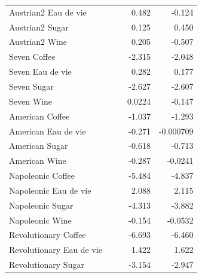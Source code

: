 \documentclass[12pt,a4paper,titlepage]{article}
\begin{document}
\begin{table}[htbp]
\begin{tabular}{l*{4}{D{.}{.}{-1}}}
Austrian2 Eau de vie&                     &                     &       0.482         &      -0.124         \\
Austrian2 Sugar     &                     &                     &       0.125         &       0.450         \\
Austrian2 Wine      &                     &                     &       0.205         &      -0.507\sym{*}  \\
Seven Coffee        &                     &                     &      -2.315\sym{***}&      -2.048\sym{***}\\
Seven Eau de vie    &                     &                     &       0.282         &       0.177         \\
Seven Sugar         &                     &                     &      -2.627\sym{***}&      -2.607\sym{***}\\
Seven Wine          &                     &                     &      0.0224         &      -0.147         \\
American Coffee     &                     &                     &      -1.037\sym{***}&      -1.293\sym{***}\\
American Eau de vie &                     &                     &      -0.271         &   -0.000709         \\
American Sugar      &                     &                     &      -0.618\sym{*}  &      -0.713\sym{*}  \\
American Wine       &                     &                     &      -0.287\sym{*}  &     -0.0241         \\
Napoleonic Coffee   &                     &                     &      -5.484\sym{***}&      -4.837\sym{***}\\
Napoleonic Eau de vie&                     &                     &       2.088\sym{***}&       2.115\sym{***}\\
Napoleonic Sugar    &                     &                     &      -4.313\sym{***}&      -3.882\sym{***}\\
Napoleonic Wine     &                     &                     &      -0.154         &     -0.0532         \\
Revolutionary Coffee&                     &                     &      -6.693\sym{***}&      -6.460\sym{***}\\
Revolutionary Eau de vie&                     &                     &       1.422\sym{***}&       1.622\sym{***}\\
Revolutionary Sugar &                     &                     &      -3.154\sym{***}&      -2.947\sym{***}\\

\end{tabular}
\end{table}
\end{document}
